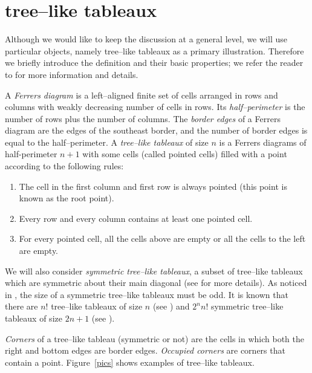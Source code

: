\documentclass[10pt]{amsart}
\numberwithin{subcase}{case}
\begin{document}
\section{tree--like tableaux}
Although we would like to keep the discussion at a general level, we will use particular objects, namely tree--like tableaux as a primary illustration. Therefore we briefly introduce the definition and their basic properties; we refer the reader to \cite{ABN, LZ,HL} for more information and details.

A {\it Ferrers diagram} is a left--aligned finite set of cells arranged in rows and columns  with weakly decreasing number of cells in rows. Its {\it half--perimeter}  is the number of rows plus the number of columns. 
The {\it border edges} of a Ferrers diagram are the edges of the southeast border, and the number of border edges is equal to the half--perimeter. 
A {\it tree--like tableaux} of size $n$ is a Ferrers diagrams of half-perimeter $n+1$ with some cells (called pointed cells) filled with a point according to the following rules:
\begin{enumerate}
\item The cell in the first column and first row is always pointed (this point is known as the root point). \label{T1}
\item Every row and every column contains at least one pointed cell. \label{T2}
\item For every pointed cell, all the cells above are empty or all the cells to the left are empty. \label{T3}
\end{enumerate}

We will also  consider {\it symmetric tree--like tableaux}, a subset of tree--like tableaux which are symmetric about their main diagonal (see \cite[Section 2.2]{ABN} for more details). 
As noticed in \cite{ABN}, the size of a symmetric tree--like tableaux must be odd.
It is known that there are $n!$ tree--like tableaux of size $n$ (see \cite[Corollary~8]{ABN}) and $2^nn!$ symmetric tree--like tableaux of size $2n+1$ (see \cite[Corollary~8]{ABN}). 

{\it Corners} of a  tree--like tableau (symmetric or not)  are the cells in which both  the right and bottom edges are border edges. {\it Occupied corners} are corners that contain a point. Figure~\ref{pics} shows examples of tree--like tableaux.
\end{document}
